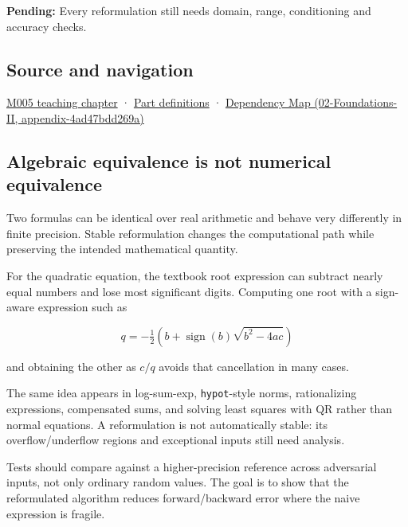 \textbf{Pending:} Every reformulation still needs domain, range, conditioning and accuracy checks.

\subsection{Source and navigation}\label{source-and-navigation}

\href{Continuous\%20Notes/Computing\%20Foundations\%20-\%20From\%20Bits\%20to\%20C++\%20and\%20Systems\%20APIs\#When\%20arithmetic\%20meets\%20uncertainty}{M005 teaching chapter} · \hyperref[appendix-fd090d982a15]{Part definitions} · \href{}{Dependency Map (02-Foundations-II, appendix-4ad47bdd269a)}

\subsection{Algebraic equivalence is not numerical equivalence}\label{algebraic-equivalence-is-not-numerical-equivalence}

Two formulas can be identical over real arithmetic and behave very differently in finite precision. Stable reformulation changes the computational path while preserving the intended mathematical quantity.

For the quadratic equation, the textbook root expression can subtract nearly equal numbers and lose most significant digits. Computing one root with a sign-aware expression such as

\[
q=-\tfrac12\left(b+\operatorname{sign}(b)\sqrt{b^2-4ac}\right)
\]

and obtaining the other as \(c/q\) avoids that cancellation in many cases.

The same idea appears in log-sum-exp, \texttt{hypot}-style norms, rationalizing expressions, compensated sums, and solving least squares with QR rather than normal equations. A reformulation is not automatically stable: its overflow/underflow regions and exceptional inputs still need analysis.

Tests should compare against a higher-precision reference across adversarial inputs, not only ordinary random values. The goal is to show that the reformulated algorithm reduces forward/backward error where the naive expression is fragile.
